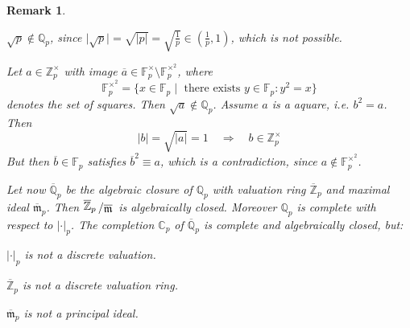\documentclass[11pt]{book}
\newtheorem{remark}[theorem]{Remark}
\theoremstyle{nonumberbreak}
\newcommand{\slant}[2]{{\raisebox{.1em}{$#1$}\left/\raisebox{-.1em}{$#2$}\right.}}
\begin{document}
\begin{spacing}{1.3}
\begin{remark}%
\begin{compactenum}
\item $\sqrt{p} \notin \mathbb{Q}_p$, since $\vert \sqrt{p} \vert = \sqrt{\vert p \vert }= \sqrt{\frac{1}{p}} \in \left(\frac{1}{p}, 1\right)$, which is not possible.
\item Let $a \in \mathbb{Z}_p^{\times}$ with image $\overline{a} \in \mathbb{F}_p^{\times} \setminus \mathbb{F}_p^{\times^2}$, where $$\mathbb{F}_p^{\times^2}=\{x \in \mathbb{F}_p \mid \textrm{ there exists } y \in \mathbb{F}_p: y^2=x \}$$
denotes the set of squares. Then $\sqrt{a} \notin \mathbb{Q}_p$.
Assume $a$ is a aquare, i.e. $b^2=a$. Then 
$$\vert b \vert = \sqrt{\vert a \vert } =1 \quad \Rightarrow \quad b \in \mathbb{Z}_p^{\times}$$
But then $\overline{b} \in \mathbb{F}_p$ satisfies $\overline{b}^2\equiv a$, which is a contradiction, since $a \notin \mathbb{F}_p^{\times^2}$.
\item Let now $\overline{\mathbb{Q}}_p$ be the algebraic closure of $\mathbb{Q}_p$ with valuation ring $\overline{\mathbb{Z}}_p$ and maximal ideal $\overline{\mathfrak{m}}_p$.
Then $\slant{\overline{\mathbb{Z}}_p}{\overline{\mathfrak{m}}}$ is algebraically closed.
Moreover $\mathbb{Q}_p$ is complete with respect to $|\cdot|_p$. The completion $\mathbb{C}_p$ of $\overline{\mathbb{Q}}_p$ is complete and algebraically closed, but:
\begin{compactenum}
\item $|\cdot|_p$ is not a discrete valuation.
\item $\overline{\mathbb{Z}}_p$ is not a discrete valuation ring.
\item $\overline{\mathfrak{m}}_p$ is not a principal ideal.
\end{compactenum}
\end{compactenum}
\end{remark}



\end{spacing}
\end{document}
